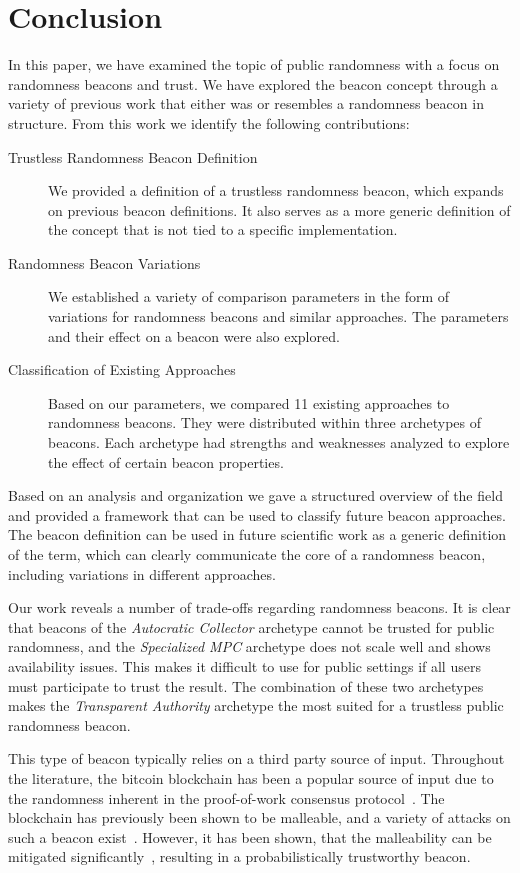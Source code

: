 \section{Conclusion}\label{sec:conclusion}
In this paper, we have examined the topic of public randomness with a focus on randomness beacons and trust.
We have explored the beacon concept through a variety of previous work that either was or resembles a randomness beacon in structure.
From this work we identify the following contributions:

\begin{description}
    \item [Trustless Randomness Beacon Definition]
We provided a definition of a trustless randomness beacon, which expands on previous beacon definitions.
It also serves as a more generic definition of the concept that is not tied to a specific implementation.
    \item [Randomness Beacon Variations]
We established a variety of comparison parameters in the form of variations for randomness beacons and similar approaches.
The parameters and their effect on a beacon were also explored.
    \item [Classification of Existing Approaches]
Based on our parameters, we compared 11 existing approaches to randomness beacons.
They were distributed within three archetypes of beacons.
Each archetype had strengths and weaknesses analyzed to explore the effect of certain beacon properties.
\end{description}

Based on an analysis and organization we gave a structured overview of the field and provided a framework that can be used to classify future beacon approaches.
The beacon definition can be used in future scientific work as a generic definition of the term, which can clearly communicate the core of a randomness beacon, including variations in different approaches.

Our work reveals a number of trade-offs regarding randomness beacons.
It is clear that beacons of the \emph{Autocratic Collector} archetype cannot be trusted for public randomness, and the \emph{Specialized MPC} archetype does not scale well and shows availability issues.
This makes it difficult to use for public settings if all users must participate to trust the result.
The combination of these two archetypes makes the \emph{Transparent Authority} archetype the most suited for a trustless public randomness beacon.

This type of beacon typically relies on a third party source of input.
Throughout the literature, the bitcoin blockchain has been a popular source of input due to the randomness inherent in the proof-of-work consensus protocol~\cite{bonneau2015bitcoin}.
The blockchain has previously been shown to be malleable, and a variety of attacks on such a beacon exist~\cite{bonneau2015bitcoin, bentov2016bitcoin, pierrot2016malleability}.
However, it has been shown, that the malleability can be mitigated significantly~\cite{bunz2017proofsof}, resulting in a probabilistically trustworthy beacon.

